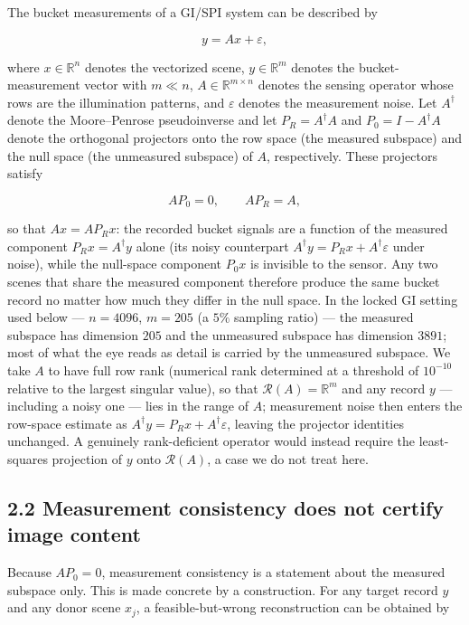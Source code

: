 \documentclass[11pt]{article}
\begin{document}
The bucket measurements of a GI/SPI system can be described by

$$y = A x + \varepsilon,$$

where $x \in \mathbb{R}^{n}$ denotes the vectorized scene, $y \in \mathbb{R}^{m}$ denotes the bucket-measurement vector with $m \ll n$, $A \in \mathbb{R}^{m\times n}$ denotes the sensing operator whose rows are the illumination patterns, and $\varepsilon$ denotes the measurement noise. Let $A^{\dagger}$ denote the Moore--Penrose pseudoinverse and let $P_R = A^{\dagger}A$ and $P_0 = I - A^{\dagger}A$ denote the orthogonal projectors onto the row space (the measured subspace) and the null space (the unmeasured subspace) of $A$, respectively. These projectors satisfy

$$A P_0 = 0, \qquad A P_R = A,$$

so that $A x = A P_R x$: the recorded bucket signals are a function of the measured component $P_R x = A^{\dagger}y$ alone (its noisy counterpart $A^{\dagger}y = P_R x + A^{\dagger}\varepsilon$ under noise), while the null-space component $P_0 x$ is invisible to the sensor. Any two scenes that share the measured component therefore produce the same bucket record no matter how much they differ in the null space. In the locked GI setting used below --- $n = 4096$, $m = 205$ (a $5\%$ sampling ratio) --- the measured subspace has dimension $205$ and the unmeasured subspace has dimension $3891$; most of what the eye reads as detail is carried by the unmeasured subspace. We take $A$ to have full row rank (numerical rank determined at a threshold of $10^{-10}$ relative to the largest singular value), so that $\mathcal{R}(A) = \mathbb{R}^m$ and any record $y$ --- including a noisy one --- lies in the range of $A$; measurement noise then enters the row-space estimate as $A^{\dagger}y = P_R x + A^{\dagger}\varepsilon$, leaving the projector identities unchanged. A genuinely rank-deficient operator would instead require the least-squares projection of $y$ onto $\mathcal{R}(A)$, a case we do not treat here.

\subsection*{2.2 Measurement consistency does not certify image content}

Because $A P_0 = 0$, measurement consistency is a statement about the measured subspace only. This is made concrete by a construction. For any target record $y$ and any donor scene $x_j$, a feasible-but-wrong reconstruction can be obtained by
\end{document}
